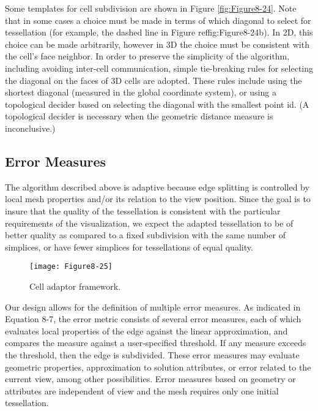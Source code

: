 Some templates for cell subdivision are shown in Figure \ref{fig:Figure8-24}. Note that in some cases a choice must be made in terms of which diagonal to select for tessellation (for example, the dashed line in Figure ref{fig:Figure8-24b}). In 2D, this choice can be made arbitrarily, however in 3D the choice must be consistent with the cell’s face neighbor. In order to preserve the simplicity of the algorithm, including avoiding inter-cell communication, simple tie-breaking rules for selecting the diagonal on the faces of 3D cells are adopted. These rules include using the shortest diagonal (measured in the global coordinate system), or using a topological decider based on selecting the diagonal with the smallest point id. (A topological decider is necessary when the geometric distance measure is inconclusive.)

\subsection{Error Measures}

The algorithm described above is adaptive because edge splitting is controlled by local mesh properties and/or its relation to the view position. Since the goal is to insure that the quality of the tessellation is consistent with the particular requirements of the visualization, we expect the adapted tessellation to be of better quality as compared to a fixed subdivision with the same number of simplices, or have fewer simplices for tessellations of equal quality.

\begin{wrapfigure}{R}{0.4\textwidth}
	\centering
	\texttt{[image: Figure8-25]}
	\caption{Cell adaptor framework.}
	\label{fig:Figure8-25}
\end{wrapfigure}

Our design allows for the definition of multiple error measures. As indicated in Equation 8-7, the error metric consists of several error measures, each of which evaluates local properties of the edge against the linear approximation, and compares the measure against a user-specified threshold. If any measure exceeds the threshold, then the edge is subdivided. These error measures may evaluate geometric properties, approximation to solution attributes, or error related to the current view, among other possibilities. Error measures based on geometry or attributes are independent of view and the mesh requires only one initial tessellation.

